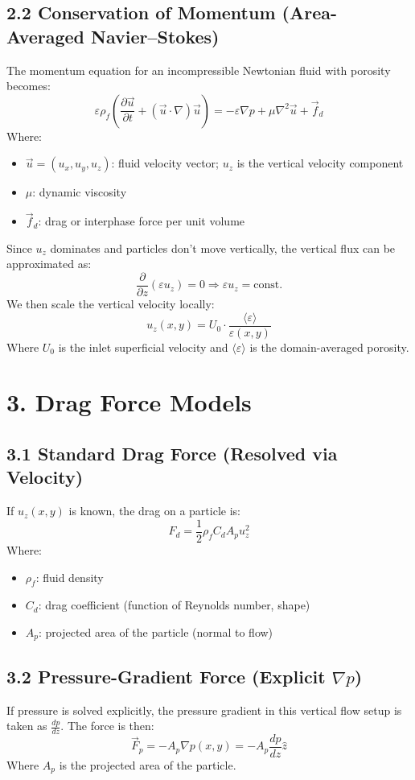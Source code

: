 \documentclass[12pt]{article}
\begin{document}
\subsection*{2.2 Conservation of Momentum (Area-Averaged Navier--Stokes)}
The momentum equation for an incompressible Newtonian fluid with porosity becomes:
\[
\varepsilon \rho_f \left( \frac{\partial \vec{u}}{\partial t} + (\vec{u} \cdot \nabla)\vec{u} \right) = -\varepsilon \nabla p + \mu \nabla^2 \vec{u} + \vec{f}_d
\]
Where:
\begin{itemize}
    \item \( \vec{u} = (u_x, u_y, u_z) \): fluid velocity vector; \( u_z \) is the vertical velocity component
    \item \( \mu \): dynamic viscosity
    \item \( \vec{f}_d \): drag or interphase force per unit volume
\end{itemize}

Since \( u_z \) dominates and particles don’t move vertically, the vertical flux can be approximated as:
\[
\frac{\partial}{\partial z} (\varepsilon u_z) = 0 \Rightarrow \varepsilon u_z = \text{const.}
\]
We then scale the vertical velocity locally:
\[
\boxed{ u_z(x, y) = U_0 \cdot \frac{\langle \varepsilon \rangle}{\varepsilon(x, y)} }
\]
Where \( U_0 \) is the inlet superficial velocity and \( \langle \varepsilon \rangle \) is the domain-averaged porosity.

\section*{3. Drag Force Models}

\subsection*{3.1 Standard Drag Force (Resolved via Velocity)}
If \( u_z(x, y) \) is known, the drag on a particle is:
\[
\boxed{ F_d = \frac{1}{2} \rho_f C_d A_p u_z^2 }
\]
Where:
\begin{itemize}
    \item \( \rho_f \): fluid density
    \item \( C_d \): drag coefficient (function of Reynolds number, shape)
    \item \( A_p \): projected area of the particle (normal to flow)
\end{itemize}

\subsection*{3.2 Pressure-Gradient Force (Explicit \( \nabla p \))}
If pressure is solved explicitly, the pressure gradient in this vertical flow setup is taken as \( \frac{dp}{dz} \). The force is then:
\[
\boxed{ \vec{F}_p = -A_p \nabla p(x, y) = -A_p \frac{dp}{dz} \hat{z} }
\]
Where \( A_p \) is the projected area of the particle.
\end{document}
